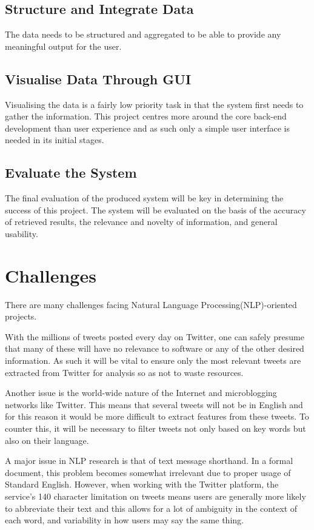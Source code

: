 \subsection{Structure and Integrate Data}
The data needs to be structured and aggregated to be able to provide any meaningful output for the user.

\subsection{Visualise Data Through GUI}
Visualising the data is a fairly low priority task in that the system first needs to gather the information. This project centres more around the core back-end development than user experience and as such only a simple user interface is needed in its initial stages.

\subsection{Evaluate the System}
The final evaluation of the produced system will be key in determining the success of this project. The system will be evaluated on the basis of the accuracy of retrieved results, the relevance and novelty of information, and general usability.

\section{Challenges}
There are many challenges facing Natural Language Processing(NLP)-oriented projects.

With the millions of tweets posted every day on Twitter, one can safely presume that many of these will have no relevance to software or any of the other desired information. As such it will be vital to ensure only the most relevant tweets are extracted from Twitter for analysis so as not to waste resources.

Another issue is the world-wide nature of the Internet and microblogging networks like Twitter. This means that several tweets will not be in English and for this reason it would be more difficult to extract features from these tweets. To counter this, it will be necessary to filter tweets not only based on key words but also on their language.

A major issue in NLP research is that of text message shorthand. In a formal document, this problem becomes somewhat irrelevant due to proper usage of Standard English. However, when working with the Twitter platform, the service's 140 character limitation on tweets means users are generally more likely to abbreviate their text and this allows for a lot of ambiguity in the context of each word, and variability in how users may say the same thing.

